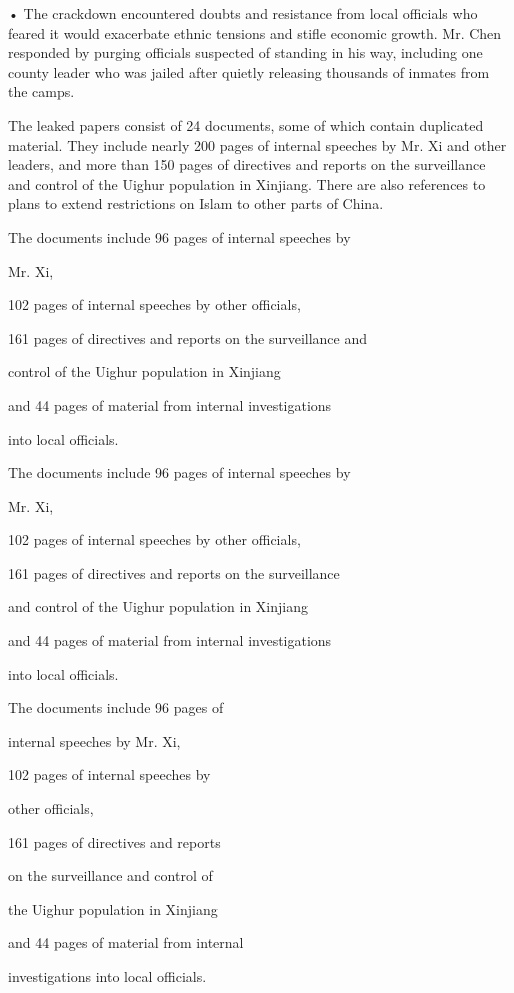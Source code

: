 • The crackdown encountered doubts and resistance from local officials
who feared it would exacerbate ethnic tensions and stifle economic
growth. Mr. Chen responded by purging officials suspected of standing in
his way, including one county leader who was jailed after quietly
releasing thousands of inmates from the camps.

The leaked papers consist of 24 documents, some of which contain
duplicated material. They include nearly 200 pages of internal speeches
by Mr. Xi and other leaders, and more than 150 pages of directives and
reports on the surveillance and control of the Uighur population in
Xinjiang. There are also references to plans to extend restrictions on
Islam to other parts of China.

The documents include 96 pages of internal speeches by

Mr. Xi,

102 pages of internal speeches by other officials,

161 pages of directives and reports on the surveillance and

control of the Uighur population in Xinjiang

and 44 pages of material from internal investigations

into local officials.

The documents include 96 pages of internal speeches by

Mr. Xi,

102 pages of internal speeches by other officials,

161 pages of directives and reports on the surveillance

and control of the Uighur population in Xinjiang

and 44 pages of material from internal investigations

into local officials.

The documents include 96 pages of

internal speeches by Mr. Xi,

102 pages of internal speeches by

other officials,

161 pages of directives and reports

on the surveillance and control of

the Uighur population in Xinjiang

and 44 pages of material from internal

investigations into local officials.

